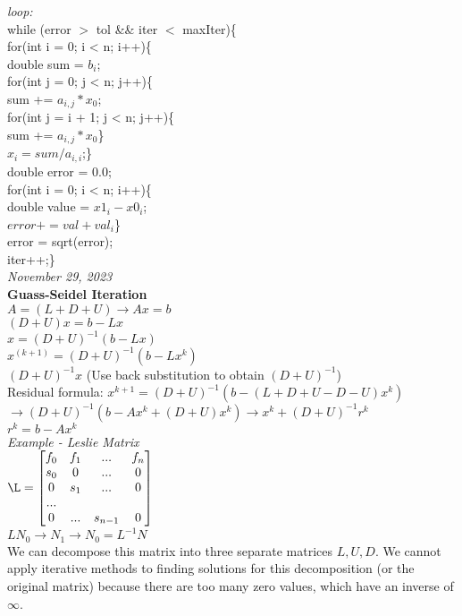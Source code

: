 \documentclass[10pt, AMS Euler]{article}
\begin{document}
\textit{loop:}\\
while (error $>$ tol \&\& iter $<$ maxIter)\{\\
for(int i = 0; i < n; i++)\{\\
double sum = $b_i$;\\
for(int j = 0; j < n; j++)\{\\
sum += $a_{i,j} * x_0$;\\
for(int j = i + 1; j < n; j++)\{\\
sum += $a_{i,j} * x_0$\}\\
$x_i = sum / a_{i,i}$;\}\\
double error = 0.0;\\
for(int i = 0; i < n; i++)\{\\
double value = $x1_i - x0_i$;\\
$error += val + val_i$\}\\
error = sqrt(error);\\
iter++;\}\\

\textit{November 29, 2023}\\

\textbf{Guass-Seidel Iteration}\\
$A = (L + D + U) \rightarrow Ax = b$\\
$(D + U) x = b - L x$\\
$x = (D + U)^{-1} (b - L x)$\\
$x^{(k+1)} = (D + U)^{-1} (b - Lx^k)$\\
$(D + U)^{-1} x$ (Use back substitution to obtain $(D + U)^{-1}$)\\
Residual formula: $x^{k+1} = (D + U)^{-1} (b - (L + D + U - D - U) x^k)$\\
$\rightarrow (D + U)^{-1} (b - Ax^k + (D + U)x^k) \rightarrow x^k + (D + U)^{-1} r^k$\\
$r^k = b - Ax^k$\\

\textit{Example - Leslie Matrix}\\
$\L =
\begin{bmatrix}
  f_0 & f_1 & ... & f_n\\
  s_0 & 0 & ... & 0\\
  0 & s_1 & ... & 0\\
  ...\\
  0 & ... & s_{n-1} & 0\\
\end{bmatrix}\\
$\\
$LN_0 \rightarrow N_1 \rightarrow N_0 = L^{-1} N $\\
We can decompose this matrix into three separate matrices $L, U, D$. We cannot apply iterative methods to finding solutions for this decomposition (or the original matrix) because there are too many zero values, which have an inverse of $\infty$.\\
\end{document}

